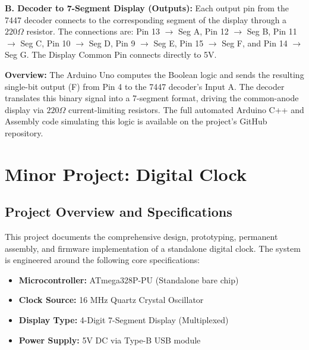 \documentclass[12pt, a4paper]{report}
\begin{document}
\textbf{B. Decoder to 7-Segment Display (Outputs):}
Each output pin from the 7447 decoder connects to the corresponding segment of the display through a $220\Omega$ resistor. 
The connections are: Pin 13 $\rightarrow$ Seg A, Pin 12 $\rightarrow$ Seg B, Pin 11 $\rightarrow$ Seg C, Pin 10 $\rightarrow$ Seg D, Pin 9 $\rightarrow$ Seg E, Pin 15 $\rightarrow$ Seg F, and Pin 14 $\rightarrow$ Seg G. The Display Common Pin connects directly to 5V.

\textbf{Overview:} The Arduino Uno computes the Boolean logic and sends the resulting single-bit output (F) from Pin 4 to the 7447 decoder's Input A. The decoder translates this binary signal into a 7-segment format, driving the common-anode display via $220\Omega$ current-limiting resistors. The full automated Arduino C++ and Assembly code simulating this logic is available on the project's GitHub repository.
\chapter{Minor Project: Digital Clock}

\section{Project Overview and Specifications}
This project documents the comprehensive design, prototyping, permanent assembly, and firmware implementation of a standalone digital clock. The system is engineered around the following core specifications:
\begin{itemize}
    \item \textbf{Microcontroller:} ATmega328P-PU (Standalone bare chip)
    \item \textbf{Clock Source:} 16 MHz Quartz Crystal Oscillator
    \item \textbf{Display Type:} 4-Digit 7-Segment Display (Multiplexed)
    \item \textbf{Power Supply:} 5V DC via Type-B USB module
\end{itemize}
\end{document}
